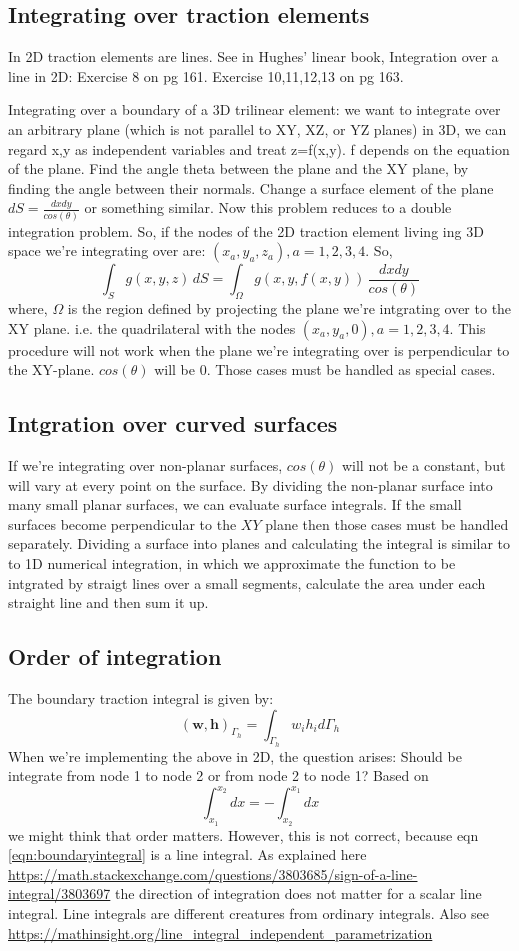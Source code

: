 \documentclass{article}
\newcommand{\beq}{\begin{equation}}
\newcommand{\eeq}{\end{equation}}
\begin{document}
\subsection{Integrating over traction elements}
In 2D traction elements are lines. See in Hughes' linear book, Integration over a line in 2D: Exercise 8 on pg 161. Exercise 10,11,12,13 on pg 163.

Integrating over a boundary of a 3D trilinear element: we want to integrate over an arbitrary plane (which is not parallel to XY, XZ, or YZ planes) in 3D, we can regard x,y as independent variables and treat z=f(x,y). f depends on the equation of the plane.  Find the angle theta between the plane and the XY plane, by finding the angle between their normals. Change a surface element of the plane $dS=\frac{dxdy}{cos(\theta)}$ or something similar. Now this problem reduces to a double integration problem. So, if the nodes of the 2D traction element living ing 3D space we're integrating over are: $(x_a,y_a,z_a), a=1,2,3,4$. So,
\beq
\int_{S}g(x,y,z)\,dS = \int_{\Omega} g(x,y,f(x,y))\,\frac{dxdy}{cos(\theta)}
\eeq
where, $\Omega$ is the region defined by projecting the plane we're intgrating over to the XY plane. i.e. the quadrilateral with the nodes $(x_a,y_a,0), a=1,2,3,4$. This procedure will not work when the plane we're integrating over is perpendicular to the XY-plane. $cos(\theta)$ will be $0$. Those cases must be handled as special cases.
\subsection{Intgration over curved surfaces}
If we're integrating over non-planar surfaces, $cos(\theta)$ will not be a constant, but will vary at every point on the surface. By dividing the non-planar surface into many small planar surfaces, we can evaluate surface integrals. If the small surfaces become perpendicular to the $XY$ plane then those cases must be handled separately. Dividing a surface into planes and calculating the integral is similar to to 1D numerical integration, in which we approximate the function to be intgrated by straigt lines over a small segments, calculate the area under each straight line and then sum it up.
\subsection{Order of integration}
The boundary traction integral is given by:
\beq
\label{eqn:boundaryintegral}
(\mathbf{w},\mathbf{h})_{\Gamma_h} = \int_{\Gamma_h}w_ih_i d\Gamma_h
\eeq
When we're implementing the above in 2D, the question arises: Should be integrate from node 1 to node 2 or from node 2 to node 1?
Based on
\beq
\int_{x_1}^{x_2} dx = -\int_{x_2}^{x_1} dx
\eeq
we might think that order matters. However, this is not correct, because eqn \ref{eqn:boundaryintegral} is a line integral. As explained here \url{https://math.stackexchange.com/questions/3803685/sign-of-a-line-integral/3803697} the direction of integration does not matter for a scalar line integral. Line integrals are different creatures from ordinary integrals. Also see \url{https://mathinsight.org/line_integral_independent_parametrization}
\end{document}
